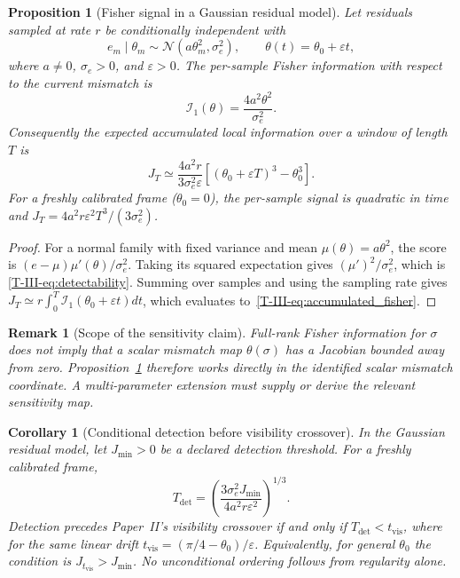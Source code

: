 \documentclass[12pt,a4paper,openany]{book}
\newtheorem{proposition}[theorem]{Proposition}
\newtheorem{remark}[theorem]{Remark}
\newtheorem{corollary}[theorem]{Corollary}
\begin{document}
\begin{proposition}[Fisher signal in a Gaussian residual model]
\label{T-III-prop:gaussian_fisher}
Let residuals sampled at rate $r$ be conditionally independent with
\begin{equation}
\label{T-III-eq:gaussian_residual}
e_m\mid\theta_m\sim\mathcal N(a\theta_m^2,\sigma_e^2),
\qquad \theta(t)=\theta_0+\varepsilon t,
\end{equation}
where $a\neq0$, $\sigma_e>0$, and $\varepsilon>0$.  The per-sample
Fisher information with respect to the current mismatch is
\begin{equation}
\label{T-III-eq:detectability}
\mathcal I_1(\theta)=\frac{4a^2\theta^2}{\sigma_e^2}.
\end{equation}
Consequently the expected accumulated local information over a window
of length $T$ is
\begin{equation}
\label{T-III-eq:accumulated_fisher}
J_T\simeq\frac{4a^2r}{3\sigma_e^2\varepsilon}
\left[(\theta_0+\varepsilon T)^3-\theta_0^3\right].
\end{equation}
For a freshly calibrated frame ($\theta_0=0$), the per-sample signal is
quadratic in time and $J_T=4a^2r\varepsilon^2T^3/(3\sigma_e^2)$.
\end{proposition}

\begin{proof}
For a normal family with fixed variance and mean
$\mu(\theta)=a\theta^2$, the score is
$(e-\mu)\mu'(\theta)/\sigma_e^2$.  Taking its squared
expectation gives $(\mu')^2/\sigma_e^2$, which is
\eqref{T-III-eq:detectability}.  Summing over samples and using the sampling
rate gives
$J_T\simeq r\int_0^T\mathcal I_1(\theta_0+\varepsilon t)dt$,
which evaluates to~\eqref{T-III-eq:accumulated_fisher}.
\end{proof}

\begin{remark}[Scope of the sensitivity claim]
\label{T-III-rem:fisher_sensitivity_scope}
Full-rank Fisher information for $\sigma$ does not imply that a scalar
mismatch map $\theta(\sigma)$ has a Jacobian bounded away from zero.
Proposition~\ref{T-III-prop:gaussian_fisher} therefore works directly in the
identified scalar mismatch coordinate.  A multi-parameter extension
must supply or derive the relevant sensitivity map.
\end{remark}

\begin{corollary}[Conditional detection before visibility crossover]
\label{T-III-cor:detection_window}
In the Gaussian residual model, let $J_{\min}>0$ be a declared
detection threshold.  For a freshly calibrated frame,
\begin{equation}
\label{T-III-eq:detection_window}
T_{\mathrm{det}}
=\left(\frac{3\sigma_e^2J_{\min}}
  {4a^2r\varepsilon^2}\right)^{1/3}.
\end{equation}
Detection precedes Paper~II's visibility crossover if and only if
$T_{\mathrm{det}}<t_{\mathrm{vis}}$, where for the same linear drift
$t_{\mathrm{vis}}=(\pi/4-\theta_0)/\varepsilon$.  Equivalently, for
general $\theta_0$ the condition is
$J_{t_{\mathrm{vis}}}>J_{\min}$.  No unconditional ordering follows
from regularity alone.
\end{corollary}
\end{document}
